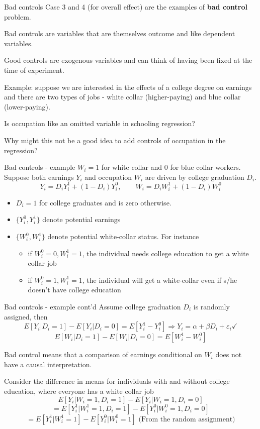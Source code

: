 \documentclass[handout]{beamer}
\begin{document}
\begin{frame}{Bad controls}
Case 3 and 4 (for overall effect) are the examples of \textbf{bad control} problem.\medskip

Bad controls are variables that are themselves outcome and like dependent variables.\medskip

Good controls are exogenous variables and can think of having been fixed at the time of experiment.\bigskip\pause

Example: suppose we are interested in  the effects of a college degree on earnings and there are two types of jobs - white collar (higher-paying) and blue collar (lower-paying). \medskip


Is occupation like an omitted variable in schooling regression?

Why might this not be a good idea to add controls of occupation in the regression?
\end{frame}

\begin{frame}{Bad controls - example}
$W_i= 1$ for white collar and 0 for blue collar workers. Suppose both earnings $Y_i$ and occupation $W_i$ are driven by college graduation $D_i$.\medskip
\[Y_i=D_iY^1_{i}+(1-D_i)Y^0_{i} , \qquad W_i=D_iW^1_{i}+(1-D_i)W^0_{i} \]
\begin{itemize}
\item $D_i = 1$ for college graduates and is zero otherwise.
\item $\{Y^0_{i}, Y^1_{i}\}$ denote potential earnings
\item $\{W^0_{i}, W^1_{i}\}$ denote potential white-collar status. For instance
\begin{itemize}
\item if $W^0_{i}=0,W^1_{i} = 1$, the
individual needs college education to get a white collar job
\item if $W^0_{i}=1,W^1_{i} = 1$, the individual
will get a white-collar even if s/he doesn't have college education
\end{itemize}
\end{itemize} 
\end{frame}

\begin{frame}{Bad controls - example cont'd}
Assume college graduation $D_i$ is randomly assigned, then
\[E[Y_i|D_i=1]-E[Y_i|D_i=0]=E[Y^1_{i}-Y^0_{i}]\Rightarrow Y_i=\alpha+\beta D_i+\varepsilon_i \checkmark \]
\[E[W_i|D_i=1]-E[W_i|D_i=0]=E[W^1_{i}-W^0_{i}] \]
\pause

Bad control means that a comparison of earnings conditional on $W_i$ does not have a causal interpretation.\medskip

Consider the difference in means for individuals with and without college education, where everyone has a white collar job
\[E[Y_i|W_i=1,D_i=1]-E[Y_i|W_i=1,D_i=0] \]
\[=E[Y^1_{i}|W^1_{i}=1,D_i=1]-E[Y^0_{i}|W^0_{i}=1,D_i=0]\]
\[=E[Y^1_{i}|W^1_{i}=1]-E[Y^0_{i}|W^0_{i}=1] \text{  (From the random assignment)}\]

\end{frame}
\end{document}
